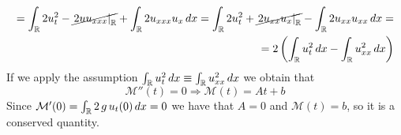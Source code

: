 \begin{enumerate}
\[\begin{split}
                  = \int_{\mathbb{R}} 2 u_t^2 - \cancel{\left. 2 u u_{xxx} \right|_{\mathbb{R}}} + \int_{\mathbb{R}} 2 u_{xxx} u_x \, dx = \int_{\mathbb{R}} 2 u_t^2 + \cancel{\left. 2 u_{xx} u_x \right|_{\mathbb{R}}} - \int_{\mathbb{R}} 2 u_{xx} u_{xx} \, dx = \\
                  = 2 \left(\int_{\mathbb{R}} u_t^2 \, dx - \int_{\mathbb{R}} u_{xx}^2 \, dx \right)
              \end{split}
          \]
          If we apply the assumption \(\int_{\mathbb{R}} u_{t}^2 \, dx \equiv \int_{\mathbb{R}}
          u_{xx}^2 \, dx\) we obtain that
          \[
              \mathcal{M}''(t) = 0 \Rightarrow \mathcal{M}(t) = At + b
          \]
          Since \(\mathcal{M}'(0) = \int_{\mathbb{R}} 2\, g \,u_t(0) \, dx = 0\) we have that
          \(A = 0\) and \(\mathcal{M}(t) = b\), so it is a conserved quantity.
\end{enumerate}

